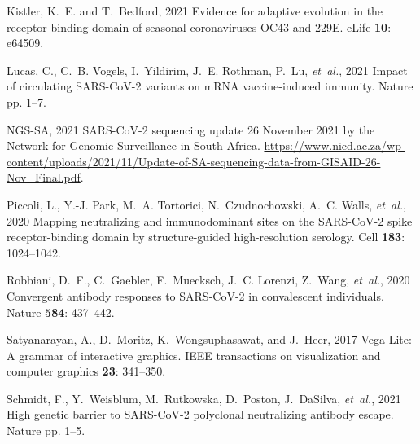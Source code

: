 \documentclass[9pt,twocolumn,twoside]{gsajnl_modified}
\begin{document}
{\begin{thebibliography}{30}
{Kistler, K.~E. {\rm and} T.~Bedford}, 2021 Evidence for adaptive evolution in
  the receptor-binding domain of seasonal coronaviruses {OC43} and {229E}.
  eLife {\bf 10}: e64509.

{Lucas, C., C.~B. Vogels, I.~Yildirim, J.~E. Rothman, P.~Lu, {\em et~al.\/}},
  2021 Impact of circulating {SARS-CoV-2} variants on {mRNA} vaccine-induced
  immunity. Nature pp. 1--7.

{{NGS-SA}}, 2021 {SARS-CoV-2 sequencing update 26 November 2021 by the Network
  for Genomic Surveillance in South Africa}.
  \url{https://www.nicd.ac.za/wp-content/uploads/2021/11/Update-of-SA-sequencing-data-from-GISAID-26-Nov_Final.pdf}.

{Piccoli, L., Y.-J. Park, M.~A. Tortorici, N.~Czudnochowski, A.~C. Walls, {\em
  et~al.\/}}, 2020 Mapping neutralizing and immunodominant sites on the
  {SARS-CoV-2} spike receptor-binding domain by structure-guided
  high-resolution serology. Cell {\bf 183}: 1024--1042.

{Robbiani, D.~F., C.~Gaebler, F.~Muecksch, J.~C. Lorenzi, Z.~Wang, {\em
  et~al.\/}}, 2020 Convergent antibody responses to {SARS-CoV-2} in
  convalescent individuals. Nature {\bf 584}: 437--442.

{Satyanarayan, A., D.~Moritz, K.~Wongsuphasawat, {\rm and} J.~Heer}, 2017
  {Vega-Lite}: A grammar of interactive graphics. IEEE transactions on
  visualization and computer graphics {\bf 23}: 341--350.

{Schmidt, F., Y.~Weisblum, M.~Rutkowska, D.~Poston, J.~DaSilva, {\em
  et~al.\/}}, 2021 High genetic barrier to {SARS-CoV-2} polyclonal neutralizing
  antibody escape. Nature pp. 1--5.


\end{thebibliography}}
\end{document}
